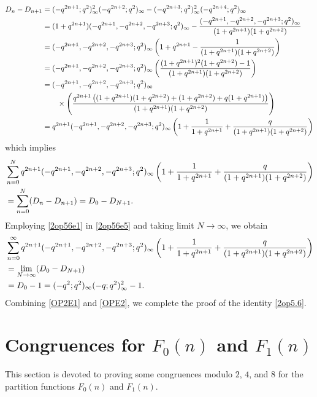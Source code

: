 \documentclass[12pt]{article}
\numberwithin{equation}{section}
\theoremstyle{definition}
\theoremstyle{remark}
\numberwithin{equation}{section}
\begin{document}
\begin{align}
D_n-D_{n+1}
&=
(-q^{2n+1};q^2)_\infty^2(-q^{2n+2};q^2)_\infty
-
(-q^{2n+3};q^2)_\infty^2(-q^{2n+4};q^2)_\infty
\notag\\
&=
(1+q^{2n+1})
(-q^{2n+1},-q^{2n+2},-q^{2n+3};q^2)_\infty
-
\dfrac{(-q^{2n+1},-q^{2n+2},-q^{2n+3};q^2)_\infty}
{(1+q^{2n+1})(1+q^{2n+2})}
\notag\\
&=
(-q^{2n+1},-q^{2n+2},-q^{2n+3};q^2)_\infty
\left(
1+q^{2n+1}
-
\dfrac{1}{(1+q^{2n+1})(1+q^{2n+2})}
\right)
\notag\\
&=
(-q^{2n+1},-q^{2n+2},-q^{2n+3};q^2)_\infty
\left(
\dfrac{
(1+q^{2n+1})^2(1+q^{2n+2})-1
}
{(1+q^{2n+1})(1+q^{2n+2})}
\right)
\notag\\
&=
(-q^{2n+1},-q^{2n+2},-q^{2n+3};q^2)_\infty
\notag\\
&\qquad \times
\left(
\dfrac{
q^{2n+1}
\left(
(1+q^{2n+1})(1+q^{2n+2})
+(1+q^{2n+2})
+q(1+q^{2n+1})
\right)
}
{(1+q^{2n+1})(1+q^{2n+2})}
\right)
\notag\\
&=
q^{2n+1}(-q^{2n+1},-q^{2n+2},-q^{2n+3};q^2)_\infty
\left(
1+\dfrac{1}{1+q^{2n+1}}
+\dfrac{q}{(1+q^{2n+1})(1+q^{2n+2})}
\right)\notag
\end{align}
which implies
\begin{align}
&\sum_{n=0}^{N}
q^{2n+1}(-q^{2n+1},-q^{2n+2},-q^{2n+3};q^2)_\infty
\left(
1+\dfrac{1}{1+q^{2n+1}}
+\dfrac{q}{(1+q^{2n+1})(1+q^{2n+2})}
\right)
\notag\\
&\label{2op56e5}=
\sum_{n=0}^{N}(D_n-D_{n+1})
=
D_0-D_{N+1}.
\end{align}
Employing \eqref{2op56e1} in \eqref{2op56e5} and taking limit $N\rightarrow\infty$, we obtain
\begin{align}
&\sum_{n=0}^{\infty}
q^{2n+1}(-q^{2n+1},-q^{2n+2},-q^{2n+3};q^2)_\infty
\left(
1+\dfrac{1}{1+q^{2n+1}}
+\dfrac{q}{(1+q^{2n+1})(1+q^{2n+2})}
\right)
\notag\\
&=
\lim_{N\to\infty}(D_0-D_{N+1})
\notag\\
&\label{OPE2}=
D_0-1=
(-q^2;q^2)_\infty(-q;q^2)_\infty^2-1.
\end{align}
Combining \eqref{OP2E1} and \eqref{OPE2}, we complete the proof of the  identity \eqref{2op5.6}.

\section{Congruences for $F_0(n)$ and $F_1(n)$} 
This section is devoted to proving some congruences modulo \( 2\), \( 4\),  and \( 8 \)  for the partition functions  \( F_0(n) \) and \( F_1(n) \).
\end{document}

